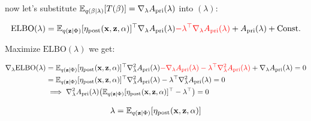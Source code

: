 \documentclass{article}
\def\DLambda{\nabla_{\lambda}}
\def\post{\text{post}}
\def\pri{\text{pri}}
\def\C{\text{Const.}}
\begin{document}
now let's substitute $\E_{q(\beta|\lambda)} [ T(\beta) ] = \DLambda A_\pri(\lambda)$ into $(\lambda)$:

\begin{equation}\begin{split}
\text{ELBO}(\lambda) &= \E_{q(\z|\Phi)} [\eta_\post (\x,\z,\alpha)]^\top  \DLambda A_\pri(\lambda) {\color{red}- \lambda^\top  \DLambda A_\pri(\lambda)} + A_\pri (\lambda) + \C \\
\end{split}\end{equation}




Maximize $\text{ELBO} (\lambda)$ we get:

\begin{equation}\begin{split}
\DLambda \text{ELBO}(\lambda) &= \E_{q(\z|\Phi)} [\eta_\post (\x,\z,\alpha)]^\top  \nabla^2_{\lambda} A_\pri(\lambda) {\color{red} - \DLambda A_\pri(\lambda) -  \lambda^\top \DLambda^2 A_\pri(\lambda)} + \DLambda A_\pri (\lambda) = 0 \\
&= \E_{q(\z|\Phi)} [\eta_\post (\x,\z,\alpha)]^\top  \nabla^2_{\lambda} A_\pri(\lambda) -  \lambda^\top \DLambda^2 A_\pri(\lambda) = 0 \\
&\implies  \nabla^2_{\lambda} A_\pri(\lambda) \big( \E_{q(\z|\Phi)} [\eta_\post (\x,\z,\alpha)]^\top   -  \lambda^\top \big) = 0 \\
\end{split}\end{equation}


\begin{equation}\begin{split}
\lambda =  \E_{q(\z|\Phi)} [\eta_\post (\x, \z,\alpha)]
\end{split}\end{equation}
\end{document}
